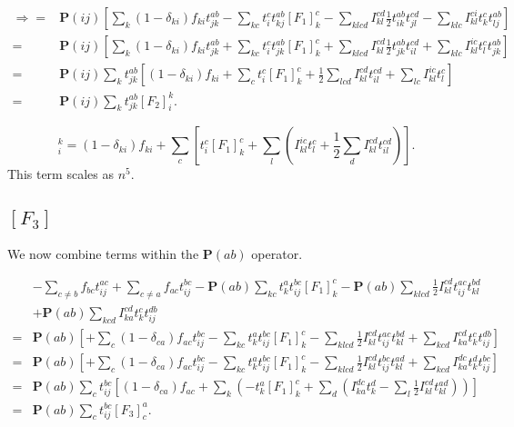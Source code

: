 \begin{align}
\Rightarrow = &
\textbf{P}(ij) \left[
\sum_{k} (1 - \delta_{ki}) f_{ki} t_{jk}^{ab}
- \sum_{kc} t_i^c t_{kj}^{ab} [F_1]_k^c
- \sum_{klcd}  I_{kl}^{cd} \frac{1}{2} t_{ik}^{ab} t_{jl}^{cd}
- \sum_{klc} I_{kl}^{ci} t_k^c t_{lj}^{ab}
\right]
\nonumber \\
= &
\textbf{P}(ij) \left[
\sum_{k} (1 - \delta_{ki}) f_{ki} t_{jk}^{ab}
+ \sum_{kc} t_i^c t_{jk}^{ab} [F_1]_k^c
+ \sum_{klcd}  I_{kl}^{cd} \frac{1}{2} t_{jk}^{ab} t_{il}^{cd}
+ \sum_{klc} I_{kl}^{ic} t_l^c t_{jk}^{ab}
\right]
\nonumber \\
= &
\textbf{P}(ij) \sum_k t_{jk}^{ab} \left[
(1 - \delta_{ki}) f_{ki}
+ \sum_c t_i^c [F_1]_k^c
+ \frac{1}{2} \sum_{lcd} I_{kl}^{cd} t_{il}^{cd}
+ \sum_{lc} I_{kl}^{ic} t_l^c
\right]
\nonumber \\
= &
\textbf{P}(ij) \sum_k t_{jk}^{ab} [F_2]_i^k .
\end{align}

\begin{equation}
[F_2]_i^k = (1 - \delta_{ki}) f_{ki}
+ \sum_c \left[t_i^c [F_1]_k^c
+ \sum_{l} \left( I_{kl}^{ic} t_l^c 
+ \frac{1}{2} \sum_{d} I_{kl}^{cd} t_{il}^{cd}
\right)
\right] .
\label{intermedF2}
\end{equation}
This term scales as $n^5$.

\subsection{$[F_3]$}
We now combine terms within the $\textbf{P}(ab)$ operator.

\begin{align}
& - \sum_{c \not= b} f_{bc} t_{ij}^{ac}
+ \sum_{c \not= a} f_{ac} t_{ij}^{bc}
- \textbf{P}(ab) \sum_{kc} t_k^a t_{ij}^{bc} [F_1]_k^c
- \textbf{P}(ab) \sum_{klcd} \frac{1}{2} I_{kl}^{cd} t_{ij}^{ac} t_{kl}^{bd}
\nonumber \\ &
+ \textbf{P}(ab) \sum_{kcd} I_{ka}^{cd} t_k^c t_{ij}^{db} \nonumber \\
= &
\textbf{P}(ab) \left[
+ \sum_c (1-\delta_{ca}) f_{ac} t_{ij}^{bc}
- \sum_{kc} t_k^a t_{ij}^{bc} [F_1]_k^c
- \sum_{klcd} \frac{1}{2} I_{kl}^{cd} t_{ij}^{ac} t_{kl}^{bd}
+ \sum_{kcd} I_{ka}^{cd} t_k^c t_{ij}^{db} 
\right]
\nonumber \\
= &
\textbf{P}(ab) \left[
+ \sum_c (1-\delta_{ca}) f_{ac} t_{ij}^{bc}
- \sum_{kc} t_k^a t_{ij}^{bc} [F_1]_k^c
- \sum_{klcd} \frac{1}{2} I_{kl}^{cd} t_{ij}^{bc} t_{kl}^{ad}
+ \sum_{kcd} I_{ka}^{dc} t_k^d t_{ij}^{bc} 
\right]
\nonumber \\
= &
\textbf{P}(ab) \sum_c t_{ij}^{bc}
\left[
(1-\delta_{ca}) f_{ac}
+ \sum_{k} \left( - t_k^a [F_1]_k^c
+ \sum_{d} \left( I_{ka}^{dc} t_k^d 
- \sum_{l} \frac{1}{2} I_{kl}^{cd} t_{kl}^{ad} \right) \right)
\right] \nonumber \\
= &
\textbf{P}(ab) \sum_c t_{ij}^{bc} [F_3]_c^a .
\end{align}

